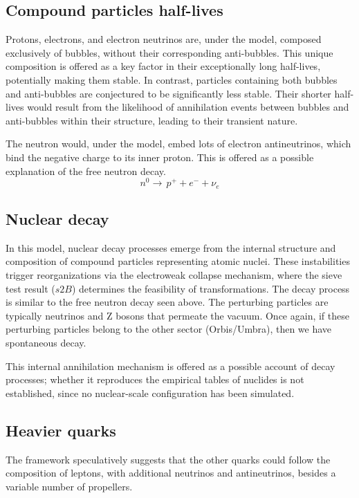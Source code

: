 \documentclass{ijuc}
\begin{document}
\subsection{Compound particles half-lives}
Protons, electrons, and electron neutrinos are, under the model, composed exclusively of bubbles, without their corresponding anti-bubbles. 
This unique composition is offered as a key factor in their exceptionally long half-lives, potentially making them stable. 
In contrast, particles containing both bubbles and anti-bubbles are conjectured to be significantly less stable. 
Their shorter half-lives would result from the likelihood of annihilation events between bubbles and anti-bubbles within their structure, leading to their transient nature.

The neutron would, under the model, embed lots of electron antineutrinos, which bind the negative charge to its inner proton. 
This is offered as a possible explanation of the free neutron decay.
\[
n^0\rightarrow\,p^{+}+e^{-}+\nu_e
\]

\subsection{Nuclear decay}

In this model, nuclear decay processes emerge from the internal structure and composition of compound particles representing atomic nuclei. 
These instabilities trigger reorganizations via the electroweak collapse mechanism, where the sieve test result ($s2B$) determines the feasibility of transformations. 
The decay process is similar to the free neutron decay seen above. 
The perturbing particles are typically neutrinos and Z bosons that permeate the vacuum. Once again, if these perturbing particles belong to the other sector (Orbis/Umbra), then we have spontaneous decay.

This internal annihilation mechanism is offered as a possible account of decay processes; whether it reproduces the empirical tables of nuclides is not established, since no nuclear-scale configuration has been simulated.

\subsection{Heavier quarks}
The framework speculatively suggests that the other quarks could follow the composition of leptons, with additional neutrinos and antineutrinos, besides a variable number of propellers.
\end{document}
